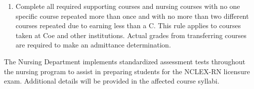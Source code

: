 \documentclass[
  letterpaper,
]{scrbook}
\providecommand{\tightlist}{%
  \setlength{\itemsep}{0pt}\setlength{\parskip}{0pt}}
\begin{document}
\begin{enumerate}
  \begin{itemize}
  \tightlist
  \item
    NUR 300 Art \& Science of Nursing\\
  \item
    NUR 305 Information Literacy \& Management\\
  \item
    NUR 315/315L/315C Pathophysiology and Assessment\\
  \item
    NUR 345 Mental Health Nursing\\
  \item
    NUR 355/355L/355C Introductory Concepts in Nursing\\
  \item
    NUR 360 Pharmacological Principles\\
  \item
    NUR 375 Legal \& Ethical Issues in Nursing\\
  \item
    NUR 415/415L/415C Advanced Concepts in Nursing\\
  \item
    NUR 425 Nursing Research\\
  \item
    NUR 430 Community \& Population Oriented Nur\\
  \item
    NUR 431 Wellness in Aging \& Chronicity\\
  \item
    NUR 455/455C Leadership and Contemporary Issues in Nursing (WE)\\
  \item
    NUR 495 Maternal Newborn Nursing\\
  \end{itemize}
\item
  Complete all required supporting courses and nursing courses with no
  one specific course repeated more than once and with no more than two
  different courses repeated due to earning less than a C. This rule
  applies to courses taken at Coe and other institutions. Actual grades
  from transferring courses are required to make an admittance
  determination.
\end{enumerate}

The Nursing Department implements standardized assessment tests
throughout the nursing program to assist in preparing students for the
NCLEX-RN licensure exam. Additional details will be provided in the
affected course syllabi.
\end{document}
